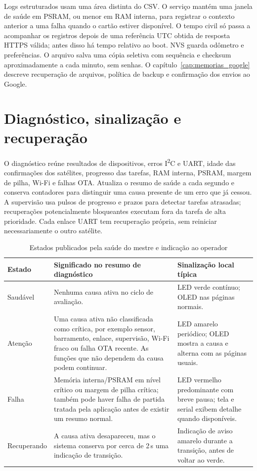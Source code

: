Logs estruturados usam uma área distinta do CSV. O serviço mantém uma janela de saúde em PSRAM, ou menor em RAM interna, para registrar o contexto anterior a uma falha quando o cartão estiver disponível. O tempo civil só passa a acompanhar os registros depois de uma referência UTC obtida de resposta HTTPS válida; antes disso há tempo relativo ao boot. NVS guarda odômetro e preferências. O arquivo  salva uma cópia seletiva com sequência e checksum aproximadamente a cada minuto, sem senhas. O capítulo~\ref{cap:memorias_google} descreve recuperação de arquivos, política de backup e confirmação dos envios ao Google.

\section{Diagnóstico, sinalização e recuperação}
O diagnóstico reúne resultados de dispositivos, erros I\textsuperscript{2}C e UART, idade das confirmações dos satélites, progresso das tarefas, RAM interna, PSRAM, margem de pilha, Wi-Fi e falhas OTA. Atualiza o resumo de saúde a cada segundo e conserva contadores para distinguir uma causa presente de um erro que já cessou. A supervisão usa pulsos de progresso e prazos para detectar tarefas atrasadas; recuperações potencialmente bloqueantes executam fora da tarefa de alta prioridade. Cada enlace UART tem recuperação própria, sem reiniciar necessariamente o outro satélite.

\begin{table}[htbp]\centering\small
\caption{Estados publicados pela saúde do mestre e indicação ao operador}\label{tab:estados-saude-firmware}
\begin{tabularx}{\textwidth}{@{}p{2.4cm}X p{4.4cm}@{}}\toprule
Estado & Significado no resumo de diagnóstico & Sinalização local típica\\\midrule
Saudável & Nenhuma causa ativa no ciclo de avaliação. & LED verde contínuo; OLED nas páginas normais.\\
Atenção & Uma causa ativa não classificada como crítica, por exemplo sensor, barramento, enlace, supervisão, Wi-Fi fraco ou falha OTA recente. As funções que não dependem da causa podem continuar. & LED amarelo periódico; OLED mostra a causa e alterna com as páginas usuais.\\
Falha & Memória interna/PSRAM em nível crítico ou margem de pilha crítica; também pode haver falha de partida tratada pela aplicação antes de existir um resumo normal. & LED vermelho predominante com breve pausa; tela e serial exibem detalhe quando disponíveis.\\
Recuperando & A causa ativa desapareceu, mas o sistema conserva por cerca de 2\,s uma indicação de transição. & Indicação de aviso amarelo durante a transição, antes de voltar ao verde.\\\bottomrule
\end{tabularx}\end{table}


